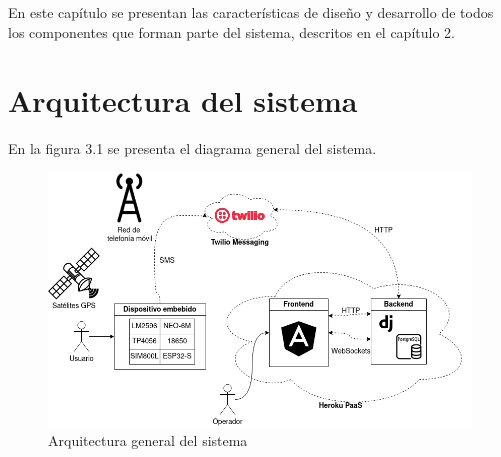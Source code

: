 En este capítulo se presentan las características de diseño y desarrollo de todos los componentes que forman parte del sistema, descritos en el capítulo 2.

\section{Arquitectura del sistema}

En la figura 3.1 se presenta el diagrama general del sistema.

\begin{figure}[H]
	\centering
	\includegraphics[width=1\textwidth]{./Figures/arquitectura.png}
	\caption{Arquitectura general del sistema}
	\label{fig:texmaker}
\end{figure}


